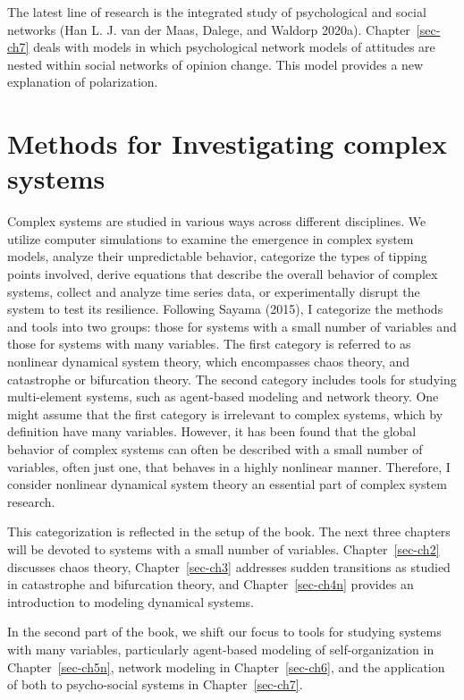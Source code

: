 \documentclass[
  a4paper,
  DIV=11,
  numbers=noendperiod]{scrreprt}
\begin{document}
The latest line of research is the integrated study of psychological and
social networks (Han L. J. van der Maas, Dalege, and Waldorp 2020a).
Chapter~\ref{sec-ch7} deals with models in which psychological network
models of attitudes are nested within social networks of opinion change.
This model provides a new explanation of polarization.

\hypertarget{sec-Methods-for-Investigating-complex-systems}{%
\section{Methods for Investigating complex
systems}\label{sec-Methods-for-Investigating-complex-systems}}

Complex systems are studied in various ways across different
disciplines. We utilize computer simulations to examine the emergence in
complex system models, analyze their unpredictable behavior, categorize
the types of tipping points involved, derive equations that describe the
overall behavior of complex systems, collect and analyze time series
data, or experimentally disrupt the system to test its resilience.
Following Sayama (2015), I categorize the methods and tools into two
groups: those for systems with a small number of variables and those for
systems with many variables. The first category is referred to as
nonlinear dynamical system theory, which encompasses chaos theory, and
catastrophe or bifurcation theory. The second category includes tools
for studying multi-element systems, such as agent-based modeling and
network theory. One might assume that the first category is irrelevant
to complex systems, which by definition have many variables. However, it
has been found that the global behavior of complex systems can often be
described with a small number of variables, often just one, that behaves
in a highly nonlinear manner. Therefore, I consider nonlinear dynamical
system theory an essential part of complex system research.

This categorization is reflected in the setup of the book. The next
three chapters will be devoted to systems with a small number of
variables. Chapter~\ref{sec-ch2} discusses chaos theory,
Chapter~\ref{sec-ch3} addresses sudden transitions as studied in
catastrophe and bifurcation theory, and Chapter~\ref{sec-ch4n} provides
an introduction to modeling dynamical systems.

In the second part of the book, we shift our focus to tools for studying
systems with many variables, particularly agent-based modeling of
self-organization in Chapter~\ref{sec-ch5n}, network modeling in
Chapter~\ref{sec-ch6}, and the application of both to psycho-social
systems in Chapter~\ref{sec-ch7}.
\end{document}
